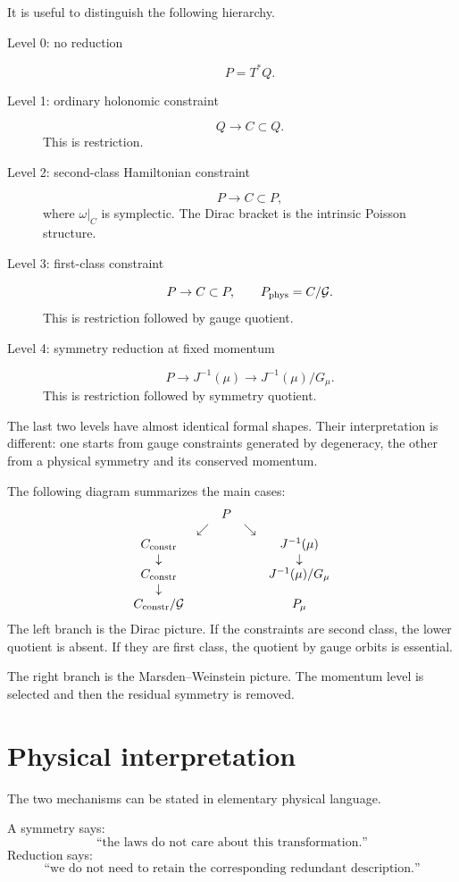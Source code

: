 It is useful to distinguish the following hierarchy.
\begin{description}
    \item [ Level 0: no reduction] \[P=T^*Q.\]
    \item [ Level 1: ordinary holonomic constraint] \[Q\to C\subset Q.\] This is restriction.
    \item [ Level 2: second-class Hamiltonian constraint] \[P\to C\subset P,\]
where $\omega|_C$ is symplectic.  The Dirac bracket is the intrinsic Poisson
structure.
    \item [ Level 3: first-class constraint] \[P\to C\subset P,\qquad P_{\rm phys}=C/\mathcal G.\]
This is restriction followed by gauge quotient.
    \item [ Level 4: symmetry reduction at fixed momentum] \[P\to J^{-1}(\mu) \to J^{-1}(\mu)/G_\mu.\]
This is restriction followed by symmetry quotient.
\end{description}
The last two levels have almost identical formal shapes.  Their interpretation
is different: one starts from gauge constraints generated by degeneracy, the
other from a physical symmetry and its conserved momentum.

The following diagram summarizes the main cases:
\[
\begin{array}{ccccc}
&& P &&\\
&\swarrow&&\searrow&\\
C_{\rm constr}&&&&J^{-1}(\mu)\\
\downarrow&&&&\downarrow\\
C_{\rm constr}&&&&J^{-1}(\mu)/G_\mu\\
\downarrow&&&&\\
C_{\rm constr}/\mathcal G&&&&P_\mu
\end{array}
\]
The left branch is the Dirac picture.  If the constraints are second class,
the lower quotient is absent.  If they are first class, the quotient by gauge
orbits is essential.

The right branch is the Marsden--Weinstein picture.  The momentum level is
selected and then the residual symmetry is removed.

\section{Physical interpretation}

The two mechanisms can be stated in elementary physical language.

A symmetry says:
\[
        \text{``the laws do not care about this transformation.''}
\]
Reduction says:
\[
        \text{``we do not need to retain the corresponding redundant
        description.''}
\]

